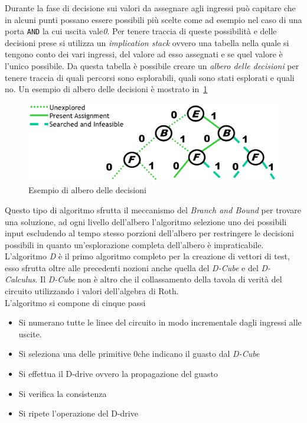 Durante la fase di decisione sui valori da assegnare agli ingressi può capitare che in alcuni punti possano essere possibili più scelte come ad esempio nel caso di una porta \texttt{AND} la cui uscita vale\emph{0}. Per tenere traccia di queste possibilità e delle decisioni prese si utilizza un \emph{implication stack} ovvero una tabella nella quale si tengono conto dei vari ingressi, del valore ad esso assegnati e se quel valore è l'unico possibile. Da questa tabella è possibile creare un \emph{albero delle decisioni} per tenere traccia di quali percorsi sono esplorabili, quali sono stati esplorati e quali no. Un esempio di albero delle decisioni è mostrato in \figurename\,\ref{fig:decisiontree}
\begin{figure}
\centering
\includegraphics[scale=0.45]{img/decisiontree.png}
\caption{Esempio di albero delle decisioni}\label{fig:decisiontree}
\end{figure}
Questo tipo di algoritmo sfrutta il meccanismo del \emph{Branch and Bound} per trovare una soluzione, ad ogni livello dell'albero l'algoritmo selezione uno dei possibili input escludendo al tempo stesso porzioni dell'albero per restringere le decisioni possibili in quanto un'esplorazione completa dell'albero è impraticabile.\\
L'algoritmo \emph{D} è il primo algoritmo completo per la creazione di vettori di test, esso sfrutta oltre alle precedenti nozioni anche quella del \emph{D-Cube} e del \emph{D-Calculus}.
Il \emph{D-Cube} non è altro che il collassamento della tavola di verità del circuito utilizzando i valori dell'algebra di Roth.\\
L'algoritmo si compone di cinque passi
\begin{itemize}
\item Si numerano tutte le linee del circuito in modo incrementale dagli ingressi alle uscite.
\item Si seleziona una delle primitive 0che indicano il guasto dal \emph{D-Cube} 
\item Si effettua il D-drive ovvero la propagazione del guasto
\item Si verifica la consistenza
\item Si ripete l'operazione del D-drive
\end{itemize}
